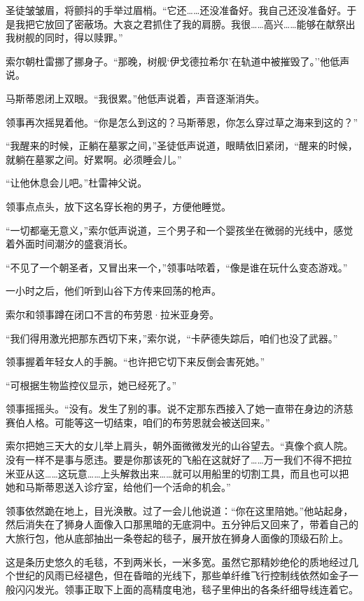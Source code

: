\documentclass[AutoFakeBold=true]{book}
\begin{document}
圣徒皱皱眉，将颤抖的手举过眉梢。``它还……还没准备好。我自己还没准备好。于是我把它放回了密蔽场。大哀之君抓住了我的肩膀。我很……高兴……能够在献祭出我树舰的同时，得以赎罪。''

索尔朝杜雷挪了挪身子。``那晚，树舰`伊戈德拉希尔'在轨道中被摧毁了。''他低声说。

马斯蒂恩闭上双眼。``我很累。''他低声说着，声音逐渐消失。

领事再次摇晃着他。``你是怎么到这的？马斯蒂恩，你怎么穿过草之海来到这的？''

``我醒来的时候，正躺在墓冢之间，''圣徒低声说道，眼睛依旧紧闭，``醒来的时候，就躺在墓冢之间。好累啊。必须睡会儿。''

``让他休息会儿吧。''杜雷神父说。

领事点点头，放下这名穿长袍的男子，方便他睡觉。

``一切都毫无意义，''索尔低声说道，三个男子和一个婴孩坐在微弱的光线中，感觉着外面时间潮汐的盛衰消长。

``不见了一个朝圣者，又冒出来一个，''领事咕哝着，``像是谁在玩什么变态游戏。''

一小时之后，他们听到山谷下方传来回荡的枪声。

\vspace*{1em}

索尔和领事蹲在闭口不言的布劳恩·拉米亚身旁。

``我们得用激光把那东西切下来，''索尔说，``卡萨德失踪后，咱们也没了武器。''

领事握着年轻女人的手腕。``也许把它切下来反倒会害死她。''

``可根据生物监控仪显示，她已经死了。''

领事摇摇头。``没有。发生了别的事。说不定那东西接入了她一直带在身边的济慈赛伯人格。可能等这一切结束，咱们的布劳恩就会被送回来。''

索尔把她三天大的女儿举上肩头，朝外面微微发光的山谷望去。``真像个疯人院。没有一样不是事与愿违。要是你那该死的飞船在这就好了……万一我们不得不把拉米亚从这……这玩意……上头解救出来……就可以用船里的切割工具，而且也可以把她和马斯蒂恩送入诊疗室，给他们一个活命的机会。''

领事依然跪在地上，目光涣散。过了一会儿他说道：``你在这里陪她。''他站起身，然后消失在了狮身人面像入口那黑暗的无底洞中。五分钟后又回来了，带着自己的大旅行包，他从底部抽出一条卷起的毯子，展开放在狮身人面像的顶级石阶上。

这是条历史悠久的毛毯，不到两米长，一米多宽。虽然它那精妙绝伦的质地经过几个世纪的风雨已经褪色，但在昏暗的光线下，那些单纤维飞行控制线依然如金子一般闪闪发光。领事正取下上面的高精度电池，毯子里伸出的各条纤细导线连着它。
\end{document}
